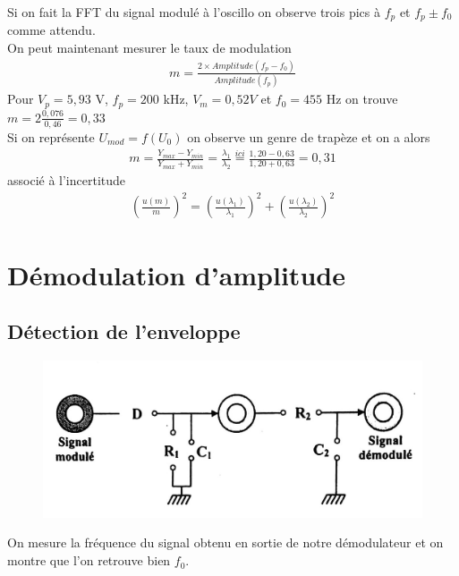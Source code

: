 \documentclass[12pt,prb,aps,epsf]{article}
\begin{document}
Si on fait la FFT du signal modulé à l'oscillo on observe trois pics à $f_p$ et $f_p \pm f_0$ comme attendu.\\

On peut maintenant mesurer le taux de modulation
\begin{eqnarray}
m = \frac{2 \times Amplitude(f_p-f_0)}{Amplitude(f_p)}
\end{eqnarray}
Pour $V_p = 5,93$ V, $f_p=200$ kHz, $V_m = 0,52V$ et $f_0=455$ Hz on trouve $m = 2\frac{0,076}{0,46} = 0,33$\\

Si on représente $U_{mod} = f(U_0)$ on observe un genre de trapèze et on a alors 
\begin{eqnarray}
m = \frac{Y_{max}- Y_{min}}{Y_{max}+Y_{min}} = \frac{\lambda_1}{\lambda_2} \stackrel{ici}{=} \frac{1,20 - 0,63}{1,20+0,63} = 0,31
\end{eqnarray}
associé à l'incertitude 
\begin{eqnarray}
\left(\frac{u(m)}{m}\right)^2 = \left(\frac{u(\lambda_1)}{\lambda_1}\right)^2 + \left(\frac{u(\lambda_2)}{\lambda_2}\right)^2
\end{eqnarray}


\section{Démodulation d'amplitude}
\subsection{Détection de l'enveloppe}
\begin{figure}[h]
	\centering \includegraphics[width=12cm]{enveloppe}
\end{figure}
On mesure la fréquence du signal obtenu en sortie de notre démodulateur et on montre que l'on retrouve bien $f_0$.
\end{document}
